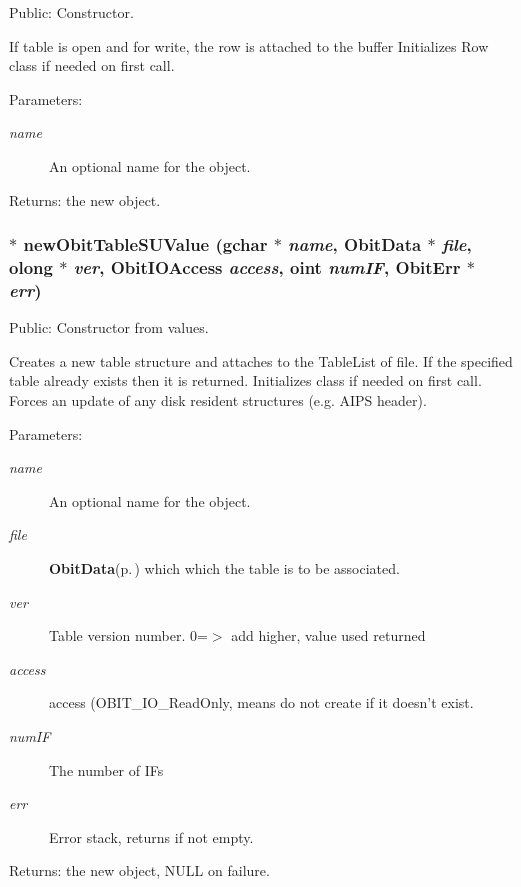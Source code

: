 Public: Constructor. 

If table is open and for write, the row is attached to the buffer Initializes Row class if needed on first call. \begin{Desc}
\item[Parameters:]
\begin{description}
\item[{\em name}]An optional name for the object. \end{description}
\end{Desc}
\begin{Desc}
\item[Returns:]the new object. \end{Desc}
\subsubsection{$\ast$ new\-Obit\-Table\-SUValue (gchar $\ast$ {\em name}, {\bf Obit\-Data} $\ast$ {\em file}, {\bf olong} $\ast$ {\em ver}, Obit\-IOAccess {\em access}, {\bf oint} {\em num\-IF}, {\bf Obit\-Err} $\ast$ {\em err})}\label{ObitTableSU_8h_a12}


Public: Constructor from values. 

Creates a new table structure and attaches to the Table\-List of file. If the specified table already exists then it is returned. Initializes class if needed on first call. Forces an update of any disk resident structures (e.g. AIPS header). \begin{Desc}
\item[Parameters:]
\begin{description}
\item[{\em name}]An optional name for the object. \item[{\em file}]{\bf Obit\-Data}{\rm (p.\,\pageref{structObitData})} which which the table is to be associated. \item[{\em ver}]Table version number. 0=$>$ add higher, value used returned \item[{\em access}]access (OBIT\_\-IO\_\-Read\-Only, means do not create if it doesn't exist. \item[{\em num\-IF}]The number of IFs \item[{\em err}]Error stack, returns if not empty. \end{description}
\end{Desc}
\begin{Desc}
\item[Returns:]the new object, NULL on failure. \end{Desc}
